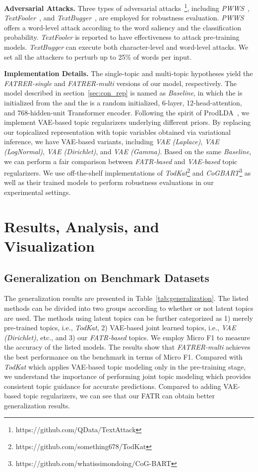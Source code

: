 \documentclass{ecai}
\begin{document}
\noindent\textbf{Adversarial Attacks.} Three types of adversarial attacks~\footnote{https://github.com/QData/TextAttack}, including \textit{PWWS}~\cite{ren-etal-2019-generating}, \textit{TextFooler}~\cite{jin2019bert}, and \textit{TextBugger}~\cite{li2018textbugger}, are employed for robustness evaluation. \textit{PWWS} offers a word-level attack according to the word saliency and the classification probability. \textit{TextFooler} is reported to have effectiveness to attack pre-training models. \textit{TextBugger} can execute both character-level and word-level attacks. We set all the attackers to perturb up to 25\% of words per input.


\noindent\textbf{Implementation Details.} The single-topic and multi-topic hypotheses yield the \textit{FATRER-single} and \textit{FATRER-multi} versions of our model, respectively. The model described in section~\ref{sec:con_rep} is named as \textit{Baseline}, in which the  is initialized from the  and the  is a random initialized, 6-layer, 12-head-attention, and 768-hidden-unit Transformer encoder. Following the spirit of ProdLDA~\cite{srivastava2017autoencoding}, we implement VAE-based topic regularizers underlying different priors. By replacing our topicalized representation with topic variables obtained via variational inference, we have VAE-based variants, including \textit{VAE (Laplace)}, \textit{VAE (LogNormal)}, \textit{VAE (Dirichlet)}, and \textit{VAE (Gamma)}. Based on the same \textit{Baseline}, we can perform a fair comparison between \textit{FATR-based} and \textit{VAE-based} topic regularizers. We use off-the-shelf implementations of \textit{TodKat}\footnote{https://github.com/something678/TodKat} and \textit{CoGBART}\footnote{https://github.com/whatissimondoing/CoG-BART} as well as their trained models to perform robustness evaluations in our experimental settings.

\section{Results, Analysis, and Visualization}
\subsection{Generalization on Benchmark Datasets} 
The generalization results are presented in Table~\ref{tab:generalization}. The listed methods can be divided into two groups according to whether or not latent topics are used. The methods using latent topics can be further categorized as 1) merely pre-trained topics, i.e., \textit{TodKat}, 2) VAE-based joint learned topics, i.e., \textit{VAE (Dirichlet)}, etc., and 3) our \textit{FATR-based} topics. We employ Micro F1 to measure the accuracy of the listed models. The results show that \textit{FATRER-multi} achieves the best performance on the benchmark in terms of Micro F1. Compared with \textit{TodKat} which applies VAE-based topic modeling only in the pre-training stage, we understand the importance of performing joint topic modeling which provides consistent topic guidance for accurate predictions. Compared to adding VAE-based topic regularizers, we can see that our FATR can obtain better generalization results.
\end{document}
